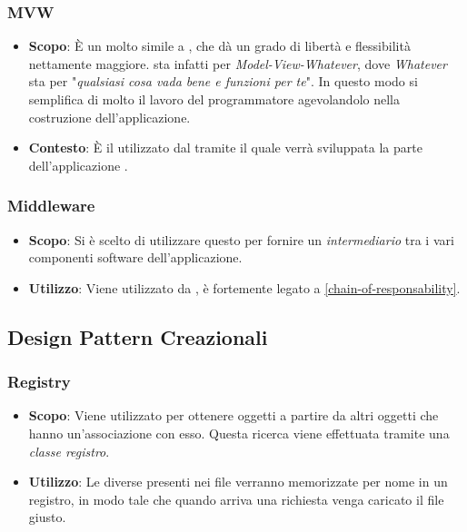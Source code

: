 \subsubsection{MVW}

\begin{itemize}

	\item \textbf{Scopo}: È un  molto simile a , che dà un grado di libertà e flessibilità nettamente maggiore.  sta infatti per \textit{Model-View-Whatever}, dove \textit{Whatever} sta per "\textit{qualsiasi cosa vada bene e funzioni per te}". In questo modo si semplifica di molto il lavoro del programmatore agevolandolo nella costruzione dell'applicazione.
	\item \textbf{Contesto}: È il  utilizzato dal   tramite il quale verrà sviluppata la parte  dell'applicazione .

\end{itemize}

\subsubsection{Middleware} 

\begin{itemize}

	\item \textbf{Scopo}: Si è scelto di utilizzare questo  per fornire un \textit{intermediario} tra i vari componenti software dell'applicazione.
	\item \textbf{Utilizzo}: Viene utilizzato da , è fortemente legato a \ref{chain-of-responsability}.

\end{itemize}

\subsection{Design Pattern Creazionali}

\subsubsection{Registry}

\begin{itemize}

	\item \textbf{Scopo}: Viene utilizzato per ottenere oggetti a partire da altri oggetti che hanno un'associazione con esso. Questa ricerca viene effettuata tramite una \textit{classe registro}.
	\item \textbf{Utilizzo}: Le diverse  presenti nei file  verranno memorizzate per nome in un registro, in modo tale che quando arriva una richiesta venga caricato il file  giusto.

\end{itemize}

